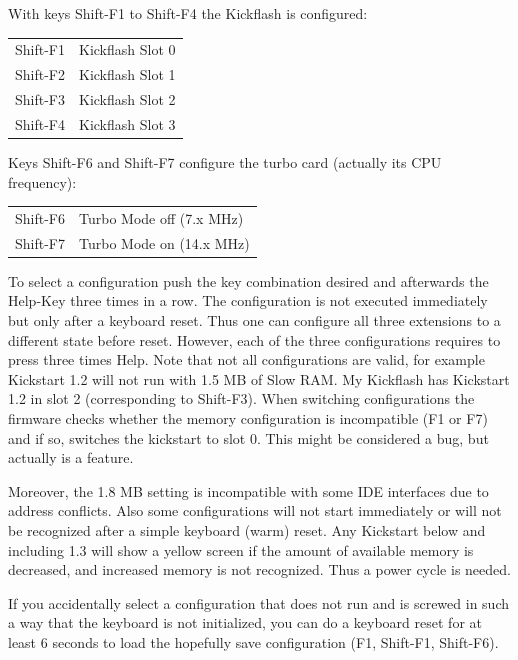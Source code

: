\documentclass[DIV10]{scrartcl}
\begin{document}
With keys Shift-F1 to Shift-F4 the Kickflash is configured:
\begin{center}
  \begin{tabular}{|l|l|}
    \hline
    Shift-F1 & Kickflash Slot 0\\
    Shift-F2 & Kickflash Slot 1\\
    Shift-F3 & Kickflash Slot 2\\
    Shift-F4 & Kickflash Slot 3\\
    \hline
  \end{tabular}
\end{center}
Keys Shift-F6 and Shift-F7 configure the turbo card (actually its CPU
frequency):
\begin{center}
  \begin{tabular}{|l|l|}
    \hline
    Shift-F6 & Turbo Mode off (7.x MHz)\\
    Shift-F7 & Turbo Mode on (14.x MHz) \\
    \hline
  \end{tabular}
\end{center}
To select a configuration push the key combination desired and
afterwards the Help-Key three times in a row. The configuration is not
executed immediately but only after a keyboard reset. Thus one can
configure all three extensions to a different state before
reset. However, each of the three configurations requires to press
three times Help. Note that not all configurations are valid, for
example Kickstart 1.2 will not run with 1.5 MB of Slow RAM. My
Kickflash has Kickstart 1.2 in slot 2 (corresponding to
Shift-F3). When switching configurations the firmware checks whether the
memory configuration is incompatible (F1 or F7) and if so, switches
the kickstart to slot 0. This might be considered a bug, but actually
is a feature.

Moreover, the 1.8 MB setting is incompatible with some IDE interfaces
due to address conflicts. Also some configurations will not start
immediately or will not be recognized after a simple keyboard (warm)
reset. Any Kickstart below and including 1.3 will show a yellow screen
if the amount of available memory is decreased, and increased memory
is not recognized. Thus a power cycle is needed.

If you accidentally select a configuration that does not run and is
screwed in such a way that the keyboard is not initialized, you can do
a keyboard reset for at least 6 seconds to load the hopefully save
configuration (F1, Shift-F1, Shift-F6).



\end{document}
